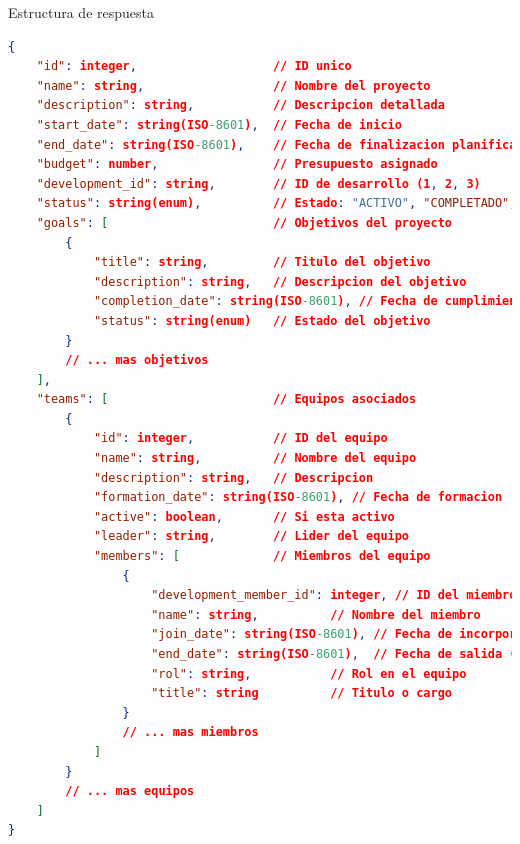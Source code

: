 \documentclass[11pt,a4paper]{article}
\begin{document}
\begin{center}
	\begin{minipage}{\textwidth}
		\begin{codebox}{Estructura de respuesta}
			\begin{lstlisting}[language=json]
{
    "id": integer,                   // ID unico
    "name": string,                  // Nombre del proyecto
    "description": string,           // Descripcion detallada
    "start_date": string(ISO-8601),  // Fecha de inicio
    "end_date": string(ISO-8601),    // Fecha de finalizacion planificada
    "budget": number,                // Presupuesto asignado
    "development_id": string,        // ID de desarrollo (1, 2, 3)
    "status": string(enum),          // Estado: "ACTIVO", "COMPLETADO", "EN_PAUSA", "CANCELADO"
    "goals": [                       // Objetivos del proyecto
        {
            "title": string,         // Titulo del objetivo
            "description": string,   // Descripcion del objetivo
            "completion_date": string(ISO-8601), // Fecha de cumplimiento
            "status": string(enum)   // Estado del objetivo
        }
        // ... mas objetivos
    ],
    "teams": [                       // Equipos asociados
        {
            "id": integer,           // ID del equipo
            "name": string,          // Nombre del equipo
            "description": string,   // Descripcion
            "formation_date": string(ISO-8601), // Fecha de formacion
            "active": boolean,       // Si esta activo
            "leader": string,        // Lider del equipo
            "members": [             // Miembros del equipo
                {
                    "development_member_id": integer, // ID del miembro
                    "name": string,          // Nombre del miembro
                    "join_date": string(ISO-8601), // Fecha de incorporacion
                    "end_date": string(ISO-8601),  // Fecha de salida (o null)
                    "rol": string,           // Rol en el equipo
                    "title": string          // Titulo o cargo
                }
                // ... mas miembros
            ]
        }
        // ... mas equipos
    ]
}
\end{lstlisting}
		\end{codebox}
	\end{minipage}
\end{center}
\end{document}
